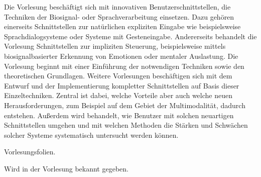 \begin{course}
\begin{content}
Die Vorlesung beschäftigt sich mit innovativen Benutzerschnittstellen, die Techniken der Biosignal- oder Sprachverarbeitung einsetzen. Dazu gehören einerseits Schnittstellen zur natürlichen expliziten Eingabe wie beispielsweise Sprachdialogsysteme oder Systeme mit Gesteneingabe. Andererseits behandelt die Vorlesung Schnittstellen zur impliziten Steuerung, beispielsweise mittels biosignalbasierter Erkennung von Emotionen oder mentaler Auslastung. Die Vorlesung beginnt mit einer Einführung der notwendigen Techniken sowie den theoretischen Grundlagen. Weitere Vorlesungen beschäftigen sich mit dem Entwurf und der Implementierung kompletter Schnittstellen auf Basis dieser Einzeltechniken. Zentral ist dabei, welche Vorteile aber auch welche neuen Herausforderungen, zum Beispiel auf dem Gebiet der Multimodalität, dadurch entstehen. Außerdem wird behandelt, wie Benutzer mit solchen neuartigen Schnittstellen umgehen und mit welchen Methoden die Stärken und Schwächen solcher Systeme systematisch untersucht werden können.


\end{content}

\begin{media}Vorlesungsfolien.

\end{media}

\begin{literature}Wird in der Vorlesung bekannt gegeben.

\end{literature}



\end{course}